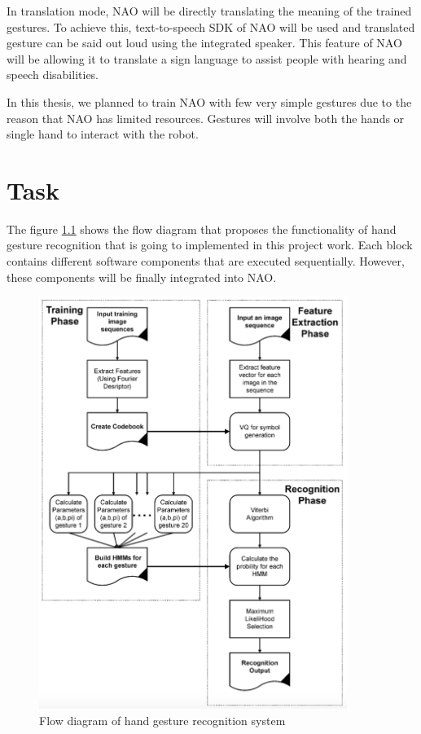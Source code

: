 In translation mode, NAO will be directly translating the meaning of the trained gestures. To achieve this, text-to-speech SDK of NAO will be used and translated gesture can be said out loud using the integrated speaker. This feature of NAO will be allowing it to translate a sign language to assist people with hearing and speech disabilities.

In this thesis, we planned to train NAO with few very simple gestures due to the reason that NAO has limited resources. Gestures will involve both the hands or single hand to interact with the robot.

\chapter{Task} The figure \ref{fig:flow} shows the flow diagram that proposes the functionality of hand gesture recognition that is going to implemented in this project work. Each block contains different software components that are executed sequentially. However, these components will be finally integrated into NAO.

\begin{figure}
	[h] \centering 
	\includegraphics[width=10cm]{figures/flow.png} \caption{Flow diagram of hand gesture recognition system} \label{fig:flow} 
\end{figure}

